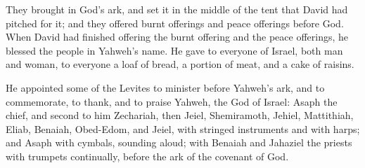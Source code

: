  They brought in God's ark, and set it in the middle of
the tent that David had pitched for it; and they offered burnt offerings
and peace offerings before God.  When David had finished
offering the burnt offering and the peace offerings, he blessed the
people in Yahweh's name.  He gave to everyone of Israel,
both man and woman, to everyone a loaf of bread, a portion of meat, and
a cake of raisins.

 He appointed some of the Levites to minister before
Yahweh's ark, and to commemorate, to thank, and to praise Yahweh, the
God of Israel:  Asaph the chief, and second to him
Zechariah, then Jeiel, Shemiramoth, Jehiel, Mattithiah, Eliab, Benaiah,
Obed-Edom, and Jeiel, with stringed instruments and with harps; and
Asaph with cymbals, sounding aloud;  with Benaiah and
Jahaziel the priests with trumpets continually, before the ark of the
covenant of God.

